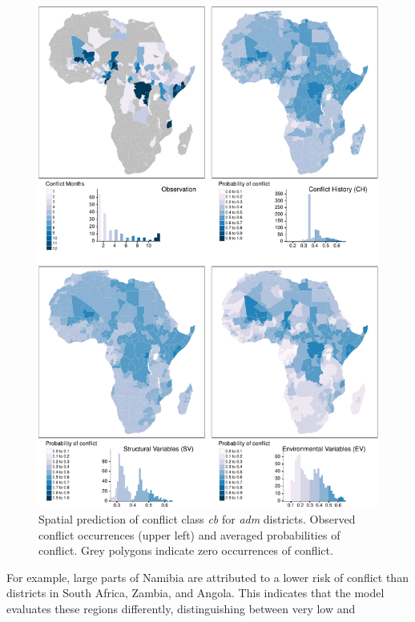 \documentclass[a4paper,11pt]{article}
\begin{document}
\begin{figure}[H]

{\centering \includegraphics{thesis_files/figure-latex/04-results-spatial-adm-1} 

}

\caption[Spatial prediction of conflict class \textit{cb} for \textit{adm} districts.]{Spatial prediction of conflict class \textit{cb} for \textit{adm} districts. Observed conflict occurrences (upper left) and averaged probabilities of conflict. Grey polygons indicate zero occurrences of conflict.}\label{fig:04-results-spatial-adm}
\end{figure}
For example, large parts of Namibia are attributed to a lower risk of conflict than
districts in South Africa, Zambia, and Angola. This indicates that the
model evaluates these regions differently, distinguishing between very low and
\end{document}
